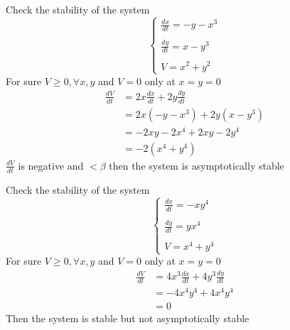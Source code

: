 \begin{example}
    Check the stability of the system
    \begin{equation*}
        \begin{cases}
            \displaystyle \frac{dx}{dt} = -y -x^3
            \\\\
            \displaystyle \frac{dy}{dt} = x -y^3
            \\\\
            \displaystyle V = x^2 + y^2
        \end{cases}
    \end{equation*}
    For sure $V \geq 0 , \forall x,y$ and $V = 0$ only at $x=y=0 $
    \begin{align*}
        \frac{dV}{dt} & = 2x \frac{dx}{dt} + 2y \frac{dy}{dt}
        \\
                      & = 2x (-y -x^3) + 2y(x -y^3)
        \\
                      & = -2xy -2x^4 +2xy -2y^4
        \\
                      & = -2 (x^4 + y^4)
    \end{align*}
    $\displaystyle \frac{dV}{dt}$ is negative and $< \beta $ then the system is asymptotically stable
\end{example}
\begin{example}
    Check the stability of the system
    \begin{equation*}
        \begin{cases}
            \displaystyle \frac{dx}{dt} = -xy^4
            \\\\
            \displaystyle \frac{dy}{dt} = yx^4
            \\\\
            \displaystyle V = x^4 + y^4
        \end{cases}
    \end{equation*}
    For sure $V \geq 0 , \forall x,y$ and $V = 0$ only at $x=y=0 $
    \begin{align*}
        \frac{dV}{dt} & = 4x^3 \frac{dx}{dt} + 4y^3 \frac{dy}{dt}
        \\
                      & = -4x^4y^4 + 4x^4y^4
        \\
                      & = 0
    \end{align*}
    Then the system is stable but not asymptotically stable
\end{example}
